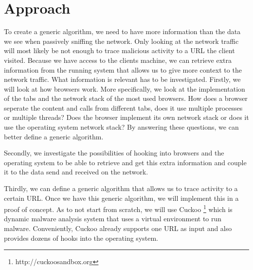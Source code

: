\documentclass{scrartcl}
\begin{document}


\section{Approach}

To create a generic algorithm, we need to have more information than the data we see when passively sniffing the network. Only looking at the network traffic will most likely be not enough to trace malicious activity to a URL the client visited. Because we have access to the clients machine, we can retrieve extra information from the running system that allows us to give more context to the network traffic. What information is relevant has to be investigated. Firstly, we will look at how browsers work. More specifically, we look at the implementation of the tabs and the network stack of the most used browsers. How does a browser seperate the content and calls from different tabs, does it use multiple processes or multiple threads? Does the browser implement its own network stack or does it use the operating system network stack? By answering these questions, we can better define a generic algorithm.

Secondly, we investigate the possibilities of hooking into browsers and the operating system to be able to retrieve and get this extra information and couple it to the data send and received on the network.

Thirdly, we can define a generic algorithm that allows us to trace activity to a certain URL. Once we have this generic algorithm, we will implement this in a proof of concept. As to not start from scratch, we will use Cuckoo \footnote{http://cuckoosandbox.org} which is dynamic malware analysis system that uses a virtual environment to run malware. Conveniently, Cuckoo already supports one URL as input and also provides dozens of hooks into the operating system. 


\end{document}
